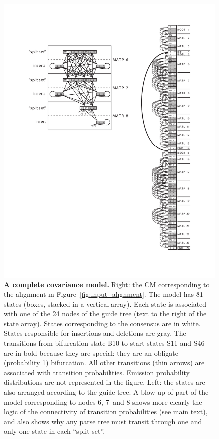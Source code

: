 \begin{figure}[tp]
\begin{center}
\includegraphics[width=5in]{Figures/cm_graph}
\end{center}
\caption{\small\textbf{A complete covariance model.} Right: the CM
corresponding to the alignment in Figure~\ref{fig:input_alignment}.
The model has 81 states (boxes, stacked in a vertical array). Each
state is associated with one of the 24 nodes of the guide tree (text
to the right of the state array). States corresponding to the
consensus are in white. States responsible for insertions and
deletions are gray. The transitions from bifurcation state B10 to
start states S11 and S46 are in bold because they are special: they
are an obligate (probability 1) bifurcation. All other transitions
(thin arrows) are associated with transition probabilities.  Emission
probability distributions are not represented in the figure. Left: the
states are also arranged according to the guide tree. A blow up of
part of the model corresponding to nodes 6, 7, and 8 shows
more clearly the logic of the connectivity of transition probabilities
(see main text), and also shows why any parse tree must transit through
one and only one state in each ``split set''.}
\label{fig:cm_graph}
\end{figure}

